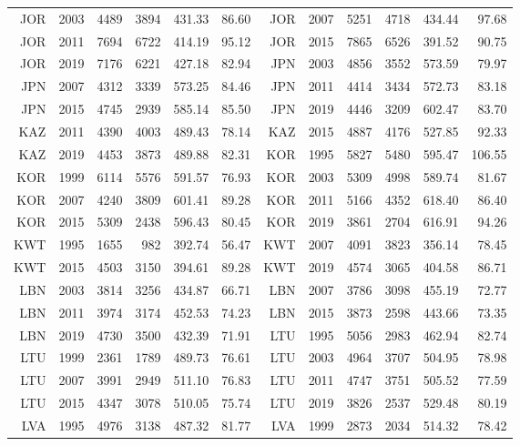 {\begin{longtable}{r|r|r|r|r|r||r|r|r|r|r|r}
    JOR   & 2003  & 4489  & 3894  & 431.33 & 86.60  & JOR   & 2007  & 5251  & 4718  & 434.44 & 97.68 \\
    JOR   & 2011  & 7694  & 6722  & 414.19 & 95.12  & JOR   & 2015  & 7865  & 6526  & 391.52 & 90.75 \\
    JOR   & 2019  & 7176  & 6221  & 427.18 & 82.94  & JPN   & 2003  & 4856  & 3552  & 573.59 & 79.97 \\
    JPN   & 2007  & 4312  & 3339  & 573.25 & 84.46  & JPN   & 2011  & 4414  & 3434  & 572.73 & 83.18 \\
    JPN   & 2015  & 4745  & 2939  & 585.14 & 85.50  & JPN   & 2019  & 4446  & 3209  & 602.47 & 83.70 \\
    KAZ   & 2011  & 4390  & 4003  & 489.43 & 78.14  & KAZ   & 2015  & 4887  & 4176  & 527.85 & 92.33 \\
    KAZ   & 2019  & 4453  & 3873  & 489.88 & 82.31  & KOR   & 1995  & 5827  & 5480  & 595.47 & 106.55 \\
    KOR   & 1999  & 6114  & 5576  & 591.57 & 76.93  & KOR   & 2003  & 5309  & 4998  & 589.74 & 81.67 \\
    KOR   & 2007  & 4240  & 3809  & 601.41 & 89.28  & KOR   & 2011  & 5166  & 4352  & 618.40 & 86.40 \\
    KOR   & 2015  & 5309  & 2438  & 596.43 & 80.45  & KOR   & 2019  & 3861  & 2704  & 616.91 & 94.26 \\
    KWT   & 1995  & 1655  & 982   & 392.74 & 56.47  & KWT   & 2007  & 4091  & 3823  & 356.14 & 78.45 \\
    KWT   & 2015  & 4503  & 3150  & 394.61 & 89.28  & KWT   & 2019  & 4574  & 3065  & 404.58 & 86.71 \\
    LBN   & 2003  & 3814  & 3256  & 434.87 & 66.71  & LBN   & 2007  & 3786  & 3098  & 455.19 & 72.77 \\
    LBN   & 2011  & 3974  & 3174  & 452.53 & 74.23  & LBN   & 2015  & 3873  & 2598  & 443.66 & 73.35 \\
    LBN   & 2019  & 4730  & 3500  & 432.39 & 71.91  & LTU   & 1995  & 5056  & 2983  & 462.94 & 82.74 \\
    LTU   & 1999  & 2361  & 1789  & 489.73 & 76.61  & LTU   & 2003  & 4964  & 3707  & 504.95 & 78.98 \\
    LTU   & 2007  & 3991  & 2949  & 511.10 & 76.83  & LTU   & 2011  & 4747  & 3751  & 505.52 & 77.59 \\
    LTU   & 2015  & 4347  & 3078  & 510.05 & 75.74  & LTU   & 2019  & 3826  & 2537  & 529.48 & 80.19 \\
    LVA   & 1995  & 4976  & 3138  & 487.32 & 81.77  & LVA   & 1999  & 2873  & 2034  & 514.32 & 78.42 \\

\end{longtable}}
